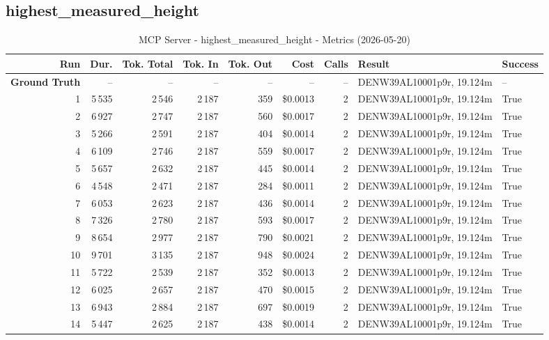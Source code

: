 \documentclass[a4paper,11pt]{article}
\begin{document}
\clearpage
\subsection{highest\_measured\_height}

\begin{table}[ht]
\centering
\scriptsize
\caption{MCP Server - highest\_measured\_height - Metrics (2026-05-20)}
\label{tab:mcp\_highest\_measured\_height\_metrics\_2026-05-20}
\begin{tabular}{r r r r r r r p{3cm} l}
\hline
Run & Dur. & Tok. Total & Tok. In & Tok. Out & Cost & Calls & Result & Success \\
\hline
\textbf{Ground Truth} & -- & -- & -- & -- & -- & -- & DENW39AL10001p9r, 19.124m & -- \\
\hline
1 & 5\,535 & 2\,546 & 2\,187 & 359 & \$0.0013 & 2 & DENW39AL10001p9r, 19.124m & True \\
2 & 6\,927 & 2\,747 & 2\,187 & 560 & \$0.0017 & 2 & DENW39AL10001p9r, 19.124m & True \\
3 & 5\,266 & 2\,591 & 2\,187 & 404 & \$0.0014 & 2 & DENW39AL10001p9r, 19.124m & True \\
4 & 6\,109 & 2\,746 & 2\,187 & 559 & \$0.0017 & 2 & DENW39AL10001p9r, 19.124m & True \\
5 & 5\,657 & 2\,632 & 2\,187 & 445 & \$0.0014 & 2 & DENW39AL10001p9r, 19.124m & True \\
6 & 4\,548 & 2\,471 & 2\,187 & 284 & \$0.0011 & 2 & DENW39AL10001p9r, 19.124m & True \\
7 & 6\,053 & 2\,623 & 2\,187 & 436 & \$0.0014 & 2 & DENW39AL10001p9r, 19.124m & True \\
8 & 7\,326 & 2\,780 & 2\,187 & 593 & \$0.0017 & 2 & DENW39AL10001p9r, 19.124m & True \\
9 & 8\,654 & 2\,977 & 2\,187 & 790 & \$0.0021 & 2 & DENW39AL10001p9r, 19.124m & True \\
10 & 9\,701 & 3\,135 & 2\,187 & 948 & \$0.0024 & 2 & DENW39AL10001p9r, 19.124m & True \\
11 & 5\,722 & 2\,539 & 2\,187 & 352 & \$0.0013 & 2 & DENW39AL10001p9r, 19.124m & True \\
12 & 6\,025 & 2\,657 & 2\,187 & 470 & \$0.0015 & 2 & DENW39AL10001p9r, 19.124m & True \\
13 & 6\,943 & 2\,884 & 2\,187 & 697 & \$0.0019 & 2 & DENW39AL10001p9r, 19.124m & True \\
14 & 5\,447 & 2\,625 & 2\,187 & 438 & \$0.0014 & 2 & DENW39AL10001p9r, 19.124m & True \\

\end{tabular}
\end{table}
\end{document}
